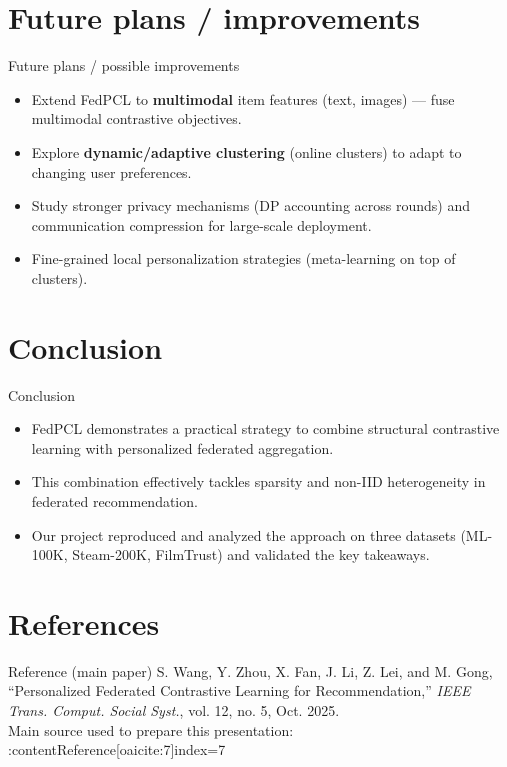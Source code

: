 \documentclass{beamer}
\begin{document}
\section{Future plans / improvements}
\begin{frame}{Future plans / possible improvements}
  \begin{itemize}
    \item Extend FedPCL to \textbf{multimodal} item features (text, images) — fuse multimodal contrastive objectives.
    \item Explore \textbf{dynamic/adaptive clustering} (online clusters) to adapt to changing user preferences.
    \item Study stronger privacy mechanisms (DP accounting across rounds) and communication compression for large-scale deployment.
    \item Fine-grained local personalization strategies (meta-learning on top of clusters).
  \end{itemize}
\end{frame}

\section{Conclusion}
\begin{frame}{Conclusion}
  \begin{itemize}
    \item FedPCL demonstrates a practical strategy to combine structural contrastive learning with personalized federated aggregation.
    \item This combination effectively tackles sparsity and non-IID heterogeneity in federated recommendation.
    \item Our project reproduced and analyzed the approach on three datasets (ML-100K, Steam-200K, FilmTrust) and validated the key takeaways.
  \end{itemize}
\end{frame}

\section{References}
\begin{frame}{Reference (main paper)}
  S. Wang, Y. Zhou, X. Fan, J. Li, Z. Lei, and M. Gong, “Personalized Federated Contrastive Learning for Recommendation,” \emph{IEEE Trans. Comput. Social Syst.}, vol. 12, no. 5, Oct. 2025.\\[6pt]
  Main source used to prepare this presentation: :contentReference[oaicite:7]{index=7}
\end{frame}
\end{document}
